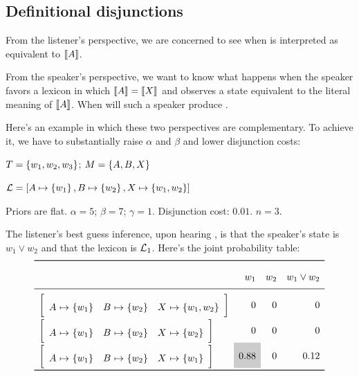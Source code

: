 \documentclass{article}
\begin{document}

\subsection{Definitional disjunctions}\label{sec:analysis:definitional}

\begin{examples}
\item From the listener's perspective, we are concerned to see when
   is interpreted as equivalent to $\llbracket A\rrbracket$.

\item From the speaker's perspective, we want to know what happens
  when the speaker favors a lexicon in which $\llbracket A\rrbracket=\llbracket X\rrbracket$ and
  observes a state equivalent to the literal meaning of $\llbracket A\rrbracket$.
  When will such a speaker produce .

\item Here's an example in which these two perspectives are
  complementary. To achieve it, we have to substantially raise
  $\alpha$ and $\beta$ and lower disjunction costs:

  \begin{examples}
  \item $T = \left\{ w_{1}, w_{2}, w_{3} \right\}$;  $M = \left\{ A, B, X \right\}$
  \item $\mathcal{L} = [A \mapsto \left\{ w_{1} \right\}, B \mapsto \left\{ w_{2} \right\}, X \mapsto \left\{ w_{1}, w_{2} \right\}]$
  \item Priors are flat. $\alpha = 5$; $\beta = 7$; $\gamma = 1$. Disjunction cost: $0.01$. $n = 3$. 
  \end{examples}

\item The listener's best guess inference, upon hearing ,
  is that the speaker's state is $w_{1} \vee w_{2}$ and that the
  lexicon is $\mathcal{L}_{1}$. Here's the joint probability table:
  \[
  \renewcommand{\arraystretch}{2}
  \begin{array}[c]{l r r r}
    \toprule
            & w_{1} & w_{2} & w_{1} \vee w_{2} \\
    \midrule
    \smallhurfordlex{w_{1}}{w_{2}}{w_{1}, w_{2}} & 0 & 0 & 0 \\
    \smallhurfordlex{w_{1}}{w_{2}}{w_{2}}        & 0 & 0 & 0 \\
    \smallhurfordlex{w_{1}}{w_{2}}{w_{1}}        & \graycell{0.88} & 0 & 0.12\\
    \bottomrule
  \end{array}
  \]


\end{examples}
\end{document}
